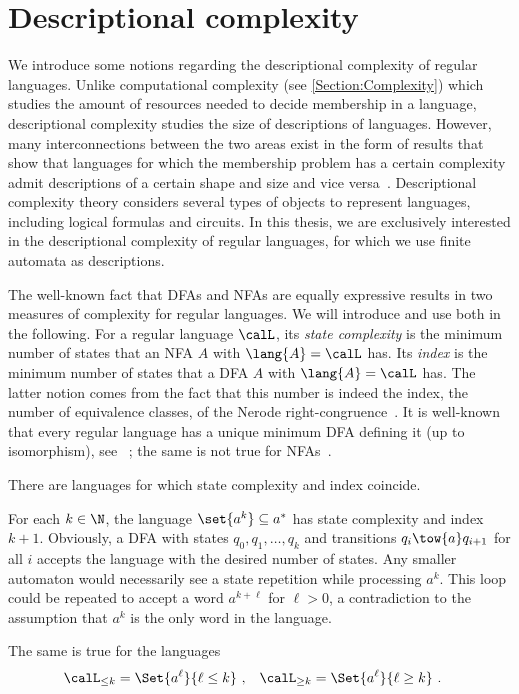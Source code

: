 \documentclass[../../diss.tex]{subfiles}
\begin{document}
\section{Descriptional complexity}%
\label{Section:DescriptionalComplexity}%

We introduce some notions regarding the descriptional complexity of regular languages.
Unlike computational complexity (see \cref{Section:Complexity}) which studies the amount of resources needed to decide membership in a language, descriptional complexity studies the size of descriptions of languages.
However, many interconnections between the two areas exist in the form of results that show that languages for which the membership problem has a certain complexity admit descriptions of a certain shape and size and vice versa~\cite{Immerman98}.
Descriptional complexity theory considers several types of objects to represent languages, including logical formulas and circuits.
In this thesis, we are exclusively interested in the descriptional complexity of regular languages, for which we use finite automata as descriptions.

The well-known fact that DFAs and NFAs are equally expressive results in two measures of complexity for regular languages.
We will introduce and use both in the following.
For a regular language $\calL$, its \emph{state complexity} is the minimum number of states that an NFA $A$ with $\lang{A} = \calL$ has.
Its \emph{index} is the minimum number of states that a DFA $A$ with $\lang{A} = \calL$ has.
The latter notion comes from the fact that this number is indeed the index, the number of equivalence classes, of the Nerode right-congruence~\cite{Nerode58}.
It is well-known that every regular language has a unique minimum DFA defining it (up to isomorphism), see \eg~\cite{HopcroftU79}; the same is not true for NFAs~\cite{JiangR93}.

There are languages for which state complexity and index coincide.

\begin{example}%
\label{Example:StateComplexityEqualsIndex}%
    For each $k \in \N$, the language $\set{ a^k } \subseteq a^*$ has state complexity and index $k+1$.
    Obviously, a DFA with states $q_0, q_1, \ldots, q_k$ and transitions $q_{i} \tow{a} q_{i+1}$ for all $i$ accepts the language with the desired number of states.
    Any smaller automaton would necessarily see a state repetition while processing $a^k$.
    This loop could be repeated to accept a word $a^{k+\ell}$ for $\ell > 0$, a contradiction to the assumption that $a^k$ is the only word in the language.

    The same is true for the languages
    \begin{align*}
        \calL_{\leq k} &= \Set{ a^\ell }{\ell \leq k}
        \ ,
        &
        \calL_{\geq k} &= \Set{ a^\ell }{\ell \geq k}
        \ .
    \end{align*}
\end{example}
\end{document}
